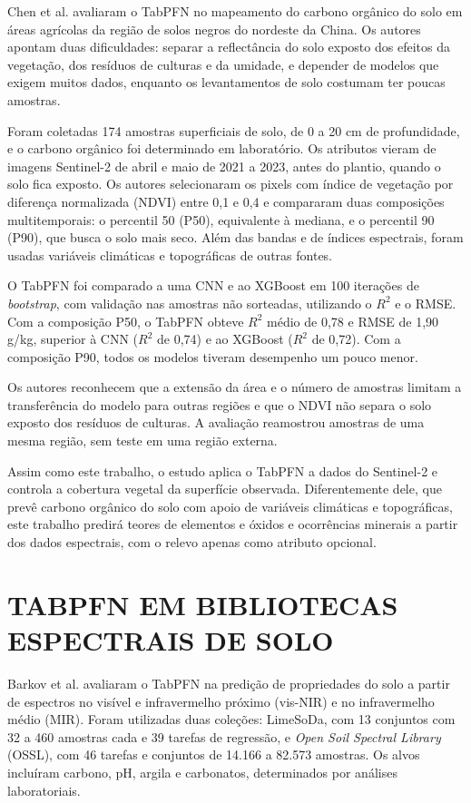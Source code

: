 Chen et al. \cite{chen2026} avaliaram o TabPFN no mapeamento do carbono orgânico do solo em áreas agrícolas da região de solos negros do nordeste da China. Os autores apontam duas dificuldades: separar a reflectância do solo exposto dos efeitos da vegetação, dos resíduos de culturas e da umidade, e depender de modelos que exigem muitos dados, enquanto os levantamentos de solo costumam ter poucas amostras.

Foram coletadas 174 amostras superficiais de solo, de 0 a 20 cm de profundidade, e o carbono orgânico foi determinado em laboratório. Os atributos vieram de imagens Sentinel-2 de abril e maio de 2021 a 2023, antes do plantio, quando o solo fica exposto. Os autores selecionaram os pixels com índice de vegetação por diferença normalizada (NDVI) entre 0,1 e 0,4 e compararam duas composições multitemporais: o percentil 50 (P50), equivalente à mediana, e o percentil 90 (P90), que busca o solo mais seco. Além das bandas e de índices espectrais, foram usadas variáveis climáticas e topográficas de outras fontes.

O TabPFN foi comparado a uma CNN e ao XGBoost em 100 iterações de \textit{bootstrap}, com validação nas amostras não sorteadas, utilizando o $R^2$ e o RMSE. Com a composição P50, o TabPFN obteve $R^2$ médio de 0,78 e RMSE de 1,90 g/kg, superior à CNN ($R^2$ de 0,74) e ao XGBoost ($R^2$ de 0,72). Com a composição P90, todos os modelos tiveram desempenho um pouco menor.

Os autores reconhecem que a extensão da área e o número de amostras limitam a transferência do modelo para outras regiões e que o NDVI não separa o solo exposto dos resíduos de culturas. A avaliação reamostrou amostras de uma mesma região, sem teste em uma região externa.

Assim como este trabalho, o estudo aplica o TabPFN a dados do Sentinel-2 e controla a cobertura vegetal da superfície observada. Diferentemente dele, que prevê carbono orgânico do solo com apoio de variáveis climáticas e topográficas, este trabalho predirá teores de elementos e óxidos e ocorrências minerais a partir dos dados espectrais, com o relevo apenas como atributo opcional.

\section{TABPFN EM BIBLIOTECAS ESPECTRAIS DE SOLO}

Barkov et al. \cite{barkov2026} avaliaram o TabPFN na predição de propriedades do solo a partir de espectros no visível e infravermelho próximo (vis-NIR) e no infravermelho médio (MIR). Foram utilizadas duas coleções: LimeSoDa, com 13 conjuntos com 32 a 460 amostras cada e 39 tarefas de regressão, e \textit{Open Soil Spectral Library} (OSSL), com 46 tarefas e conjuntos de 14.166 a 82.573 amostras. Os alvos incluíram carbono, pH, argila e carbonatos, determinados por análises laboratoriais.

